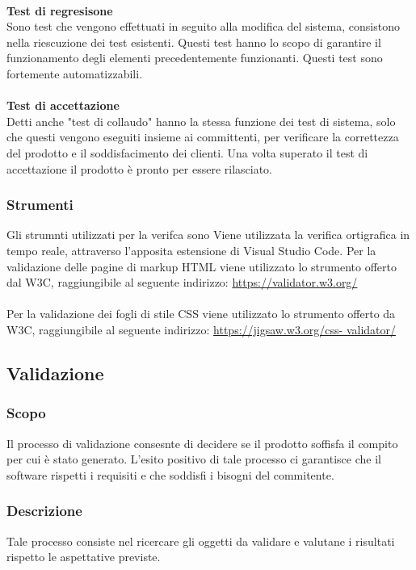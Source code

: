             \\
            \textbf{Test di regresisone}\\
            Sono test che vengono effettuati in seguito alla modifica del sistema, consistono nella riescuzione dei test esistenti. Questi test hanno lo scopo di garantire il funzionamento degli elementi precedentemente funzionanti. Questi test sono fortemente automatizzabili.\\\\
            \textbf{Test di accettazione}\\
            Detti anche "test di collaudo" hanno la stessa funzione dei test di sistema, solo che questi vengono eseguiti insieme ai committenti, per verificare la correttezza del prodotto e il soddisfacimento dei clienti. Una volta superato il test di accettazione il prodotto è pronto per essere rilasciato.
            \subsubsection{Strumenti}
            Gli strumnti utilizzati per la verifca sono
            Viene utilizzata la verifica ortigrafica in tempo reale, attraverso l'apposita estensione di Visual Studio Code. 
            Per la validazione delle pagine di markup HTML viene utilizzato lo strumento offerto dal W3C, raggiungibile al seguente indirizzo:
            \href{https://validator.w3.org/}{https://validator.w3.org/}\\\\
            Per la validazione dei fogli di stile CSS viene utilizzato lo strumento offerto da W3C, raggiungibile al seguente indirizzo:
            \href{https://jigsaw.w3.org/css- validator/}{https://jigsaw.w3.org/css- validator/}           
    \subsection{Validazione}
        \subsubsection{Scopo}
        Il processo di validazione consesnte di decidere se il prodotto soffisfa il compito per cui è stato generato. L'esito positivo di tale processo ci garantisce che il software rispetti i requisiti e che soddisfi i bisogni del commitente.
        \subsubsection{Descrizione}
        Tale processo consiste nel ricercare gli oggetti da validare e valutane i risultati rispetto le aspettative previste.
